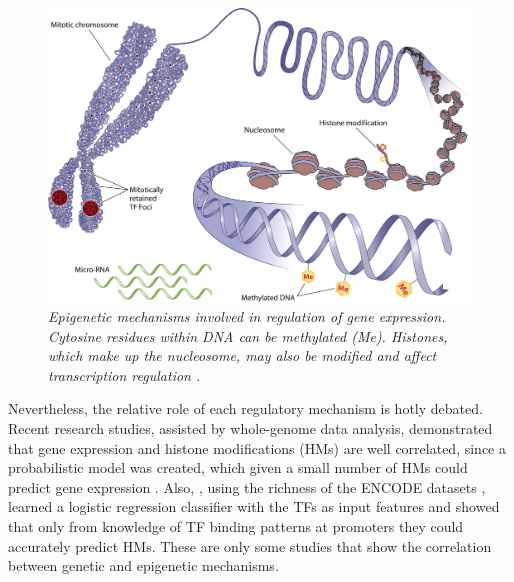 \begin{figure}[!ht]
\begin{center}
 \includegraphics[scale = 0.3]{images/epigenetics}
\caption{\emph{Epigenetic mechanisms involved in regulation of gene expression. Cytosine residues within DNA can be methylated (Me). Histones, which make up the nucleosome, may also be modified and affect transcription regulation \citep{Horsager2014}.}}
\label{epigenetics-pic}
\end{center}
\end{figure}


Nevertheless, the relative role of each regulatory mechanism is hotly debated. Recent research studies, assisted by whole-genome data analysis, demonstrated that gene expression and histone modifications (HMs) are well correlated, since a probabilistic model was created, which given a small number of HMs could predict gene expression \citep{Karlic2010}. Also, \citet{Benveniste2014}, using the richness of the ENCODE datasets \citep{Dunham2012}, learned a logistic regression classifier with the TFs as input features and showed that only from knowledge of TF binding patterns at promoters they could accurately predict HMs. These are only some studies that show the correlation between genetic and epigenetic mechanisms. 